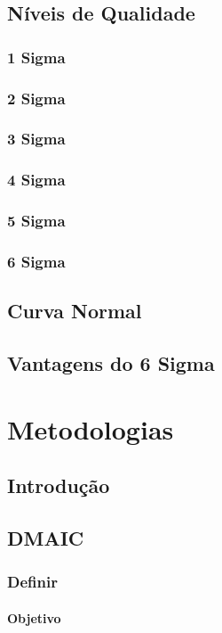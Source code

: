 \documentclass{abnt}
\begin{document}
		\section {Níveis de Qualidade}
			\subsection {1 Sigma}
			\subsection {2 Sigma}
			\subsection {3 Sigma}
			\subsection {4 Sigma}
			\subsection {5 Sigma}
			\subsection {6 Sigma}
		\section {Curva Normal}	
		\section {Vantagens do 6 Sigma}
				
	\chapter {Metodologias}
		\section {Introdução}
			\section {DMAIC}
				\subsection {Definir}
					\subsubsection {Objetivo}
\end{document}
